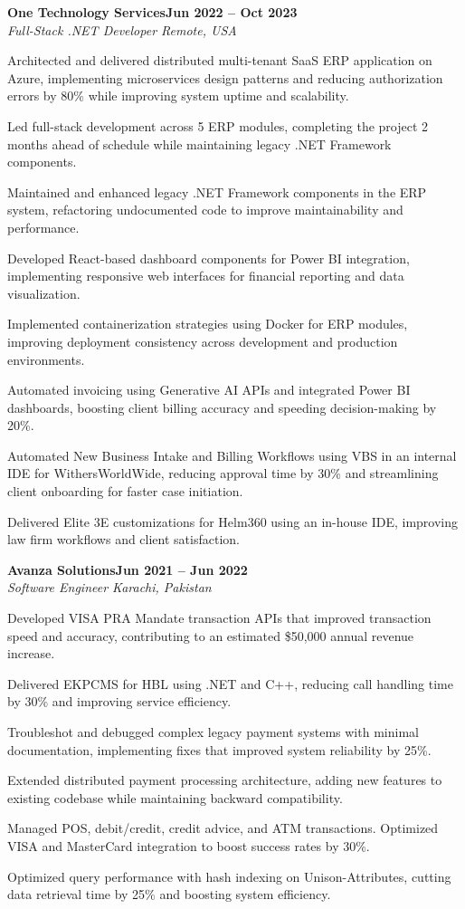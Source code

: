 \documentclass[letterpaper,10pt]{article}
\newcommand{\headingBf}[2]{
  \hspace{10pt}\textbf{#1}\hfill\textbf{#2}\\
}
\newcommand{\headingIt}[2]{
  \hspace{10pt}\textit{#1}\hfill\textit{#2}\\
}
\newenvironment{resume_list}{
  \vspace{-7pt}
  \begin{itemize}[itemsep=-2px, parsep=1pt, leftmargin=30pt]
}{
  \end{itemize}
}
\begin{document}
\headingBf{One Technology Services}{Jun 2022 -- Oct 2023}
\headingIt{Full-Stack .NET Developer \hfill Remote, USA}{}
\begin{resume_list}
    \item Architected and delivered distributed multi-tenant SaaS ERP application on Azure, implementing microservices design patterns and reducing authorization errors by 80\% while improving system uptime and scalability.
    \item Led full-stack development across 5 ERP modules, completing the project 2 months ahead of schedule while maintaining legacy .NET Framework components.
    \item Maintained and enhanced legacy .NET Framework components in the ERP system, refactoring undocumented code to improve maintainability and performance.
    \item Developed React-based dashboard components for Power BI integration, implementing responsive web interfaces for financial reporting and data visualization.
    \item Implemented containerization strategies using Docker for ERP modules, improving deployment consistency across development and production environments.
    \item Automated invoicing using Generative AI APIs and integrated Power BI dashboards, boosting client billing accuracy and speeding decision-making by 20\%.
    \item Automated New Business Intake and Billing Workflows using VBS in an internal IDE for WithersWorldWide, reducing approval time by 30\% and streamlining client onboarding for faster case initiation.
    \item Delivered Elite 3E customizations for Helm360 using an in-house IDE, improving law firm workflows and client satisfaction.
\end{resume_list}

\headingBf{Avanza Solutions}{Jun 2021 -- Jun 2022}
\headingIt{Software Engineer \hfill Karachi, Pakistan}{}
\begin{resume_list}
    \item Developed VISA PRA Mandate transaction APIs that improved transaction speed and accuracy, contributing to an estimated \$50,000 annual revenue increase.
    \item Delivered EKPCMS for HBL using .NET and C++, reducing call handling time by 30\% and improving service efficiency.
    \item Troubleshot and debugged complex legacy payment systems with minimal documentation, implementing fixes that improved system reliability by 25\%.
    \item Extended distributed payment processing architecture, adding new features to existing codebase while maintaining backward compatibility.
    \item Managed POS, debit/credit, credit advice, and ATM transactions. Optimized VISA and MasterCard integration to boost success rates by 30\%.
    \item Optimized query performance with hash indexing on Unison-Attributes, cutting data retrieval time by 25\% and boosting system efficiency.
\end{resume_list}
\end{document}
